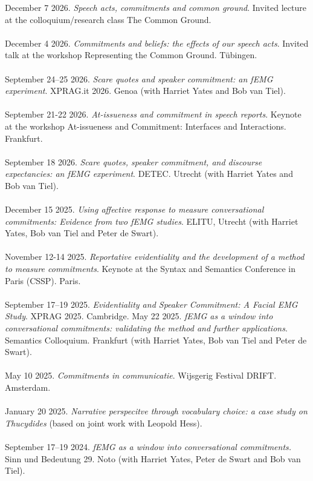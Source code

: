 \documentclass[a4paper,11pt]{article}
\begin{document}
December 7 2026. \emph{Speech acts, commitments and common ground}. Invited lecture at the colloquium/research class The Common Ground.\\\\
December 4 2026. \emph{Commitments and beliefs: the effects of our speech acts}. Invited talk at the workshop Representing the Common Ground. Tübingen.\\\\
September 24--25 2026. \emph{Scare quotes and speaker commitment: an fEMG experiment}. XPRAG.it 2026. Genoa (with Harriet Yates and Bob van Tiel).\\\\
September 21-22 2026. \emph{At-issueness and commitment in speech reports}. Keynote at the workshop At-issueness and Commitment: Interfaces and Interactions. Frankfurt.\\\\
September 18 2026. \emph{Scare quotes, speaker commitment, and discourse expectancies: an fEMG experiment}. DETEC. Utrecht  (with Harriet Yates and Bob van Tiel).\\\\
December 15 2025. \emph{Using affective response to measure conversational commitments: Evidence from two fEMG studies}. ELITU, Utrecht (with Harriet Yates, Bob van Tiel and Peter de Swart).\\\\
November 12-14 2025. \emph{Reportative evidentiality and the development of a method to measure commitments}. Keynote at the Syntax and Semantics Conference in Paris (CSSP). Paris.\\\\
September 17--19 2025.  \emph{Evidentiality and Speaker Commitment: A Facial EMG Study}.  XPRAG 2025. Cambridge.
May 22 2025. \emph{fEMG as a window into conversational commitments: validating the method and further applications}. Semantics Colloquium. Frankfurt (with Harriet Yates, Bob van Tiel and Peter de Swart).\\\\
May 10 2025. \emph{Commitments in communicatie}. Wijsgerig Festival DRIFT. Amsterdam.\\\\ 
January 20 2025. \emph{Narrative perspecitve through vocabulary choice: a case study on Thucydides} (based on joint work with Leopold Hess).\\\\
September 17--19 2024. \emph{fEMG as a window into conversational commitments.} Sinn und Bedeutung 29. Noto (with Harriet Yates, Peter de Swart and Bob van Tiel).\\\\
\end{document}
